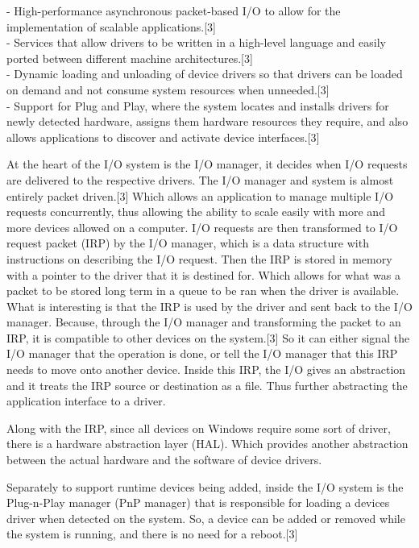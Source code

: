 \documentclass[10pt,conference,draftclsnofoot,onecolumn]{IEEEtran}
\begin{document}
 - High-performance asynchronous packet-based I/O to allow for the implementation of scalable applications.[3] \\

- Services that allow drivers to be written in a high-level language and easily ported between different machine architectures.[3]\\

- Dynamic loading and unloading of device drivers so that drivers can be loaded on demand and not consume system resources when unneeded.[3] \\

- Support for Plug and Play, where the system locates and installs drivers for newly detected hardware, assigns them hardware resources they require, and also allows applications to discover and activate device interfaces.[3] \newline \newline


At the heart of the I/O system is the I/O manager, it decides when I/O requests are delivered to the respective drivers. The I/O manager and system is almost entirely packet driven.[3] Which allows an application to manage multiple I/O requests concurrently, thus allowing the ability to scale easily with more and more devices allowed on a computer. I/O requests are then transformed to I/O request packet (IRP)  by the I/O manager, which is a data structure with instructions on describing the I/O request. Then the IRP is stored in memory with a pointer to the driver that it is destined for. Which allows for what was a packet to be stored long term in a queue to be ran when the driver is available. What is interesting is that the IRP is used by the driver and sent back to the I/O manager. Because, through the I/O manager and transforming the packet to an IRP, it is compatible to other devices on the system.[3] So it can either signal the I/O manager that the operation is done, or tell the I/O manager that this IRP needs to move onto another device. Inside this IRP, the I/O gives an abstraction and it treats the IRP source or destination as a file. Thus further abstracting the application interface to a driver.


Along with the IRP, since all devices on Windows require some sort of driver, there is a hardware abstraction layer (HAL). Which provides another abstraction between the actual hardware and the software of device drivers.

Separately to support runtime devices being added, inside the I/O system is the Plug-n-Play manager (PnP manager) that is responsible for loading a devices driver when detected on the system. So, a device can be added or removed while the system is running, and there is no need for a reboot.[3] \newpage
\end{document}
